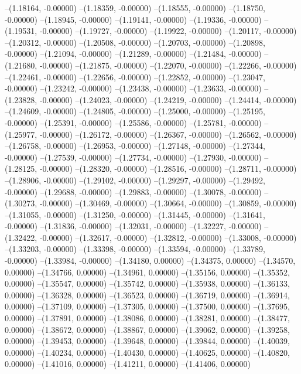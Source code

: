 --(1.18164, -0.00000)
--(1.18359, -0.00000)
--(1.18555, -0.00000)
--(1.18750, -0.00000)
--(1.18945, -0.00000)
--(1.19141, -0.00000)
--(1.19336, -0.00000)
--(1.19531, -0.00000)
--(1.19727, -0.00000)
--(1.19922, -0.00000)
--(1.20117, -0.00000)
--(1.20312, -0.00000)
--(1.20508, -0.00000)
--(1.20703, -0.00000)
--(1.20898, -0.00000)
--(1.21094, -0.00000)
--(1.21289, -0.00000)
--(1.21484, -0.00000)
--(1.21680, -0.00000)
--(1.21875, -0.00000)
--(1.22070, -0.00000)
--(1.22266, -0.00000)
--(1.22461, -0.00000)
--(1.22656, -0.00000)
--(1.22852, -0.00000)
--(1.23047, -0.00000)
--(1.23242, -0.00000)
--(1.23438, -0.00000)
--(1.23633, -0.00000)
--(1.23828, -0.00000)
--(1.24023, -0.00000)
--(1.24219, -0.00000)
--(1.24414, -0.00000)
--(1.24609, -0.00000)
--(1.24805, -0.00000)
--(1.25000, -0.00000)
--(1.25195, -0.00000)
--(1.25391, -0.00000)
--(1.25586, -0.00000)
--(1.25781, -0.00000)
--(1.25977, -0.00000)
--(1.26172, -0.00000)
--(1.26367, -0.00000)
--(1.26562, -0.00000)
--(1.26758, -0.00000)
--(1.26953, -0.00000)
--(1.27148, -0.00000)
--(1.27344, -0.00000)
--(1.27539, -0.00000)
--(1.27734, -0.00000)
--(1.27930, -0.00000)
--(1.28125, -0.00000)
--(1.28320, -0.00000)
--(1.28516, -0.00000)
--(1.28711, -0.00000)
--(1.28906, -0.00000)
--(1.29102, -0.00000)
--(1.29297, -0.00000)
--(1.29492, -0.00000)
--(1.29688, -0.00000)
--(1.29883, -0.00000)
--(1.30078, -0.00000)
--(1.30273, -0.00000)
--(1.30469, -0.00000)
--(1.30664, -0.00000)
--(1.30859, -0.00000)
--(1.31055, -0.00000)
--(1.31250, -0.00000)
--(1.31445, -0.00000)
--(1.31641, -0.00000)
--(1.31836, -0.00000)
--(1.32031, -0.00000)
--(1.32227, -0.00000)
--(1.32422, -0.00000)
--(1.32617, -0.00000)
--(1.32812, -0.00000)
--(1.33008, -0.00000)
--(1.33203, -0.00000)
--(1.33398, -0.00000)
--(1.33594, -0.00000)
--(1.33789, -0.00000)
--(1.33984, -0.00000)
--(1.34180, 0.00000)
--(1.34375, 0.00000)
--(1.34570, 0.00000)
--(1.34766, 0.00000)
--(1.34961, 0.00000)
--(1.35156, 0.00000)
--(1.35352, 0.00000)
--(1.35547, 0.00000)
--(1.35742, 0.00000)
--(1.35938, 0.00000)
--(1.36133, 0.00000)
--(1.36328, 0.00000)
--(1.36523, 0.00000)
--(1.36719, 0.00000)
--(1.36914, 0.00000)
--(1.37109, 0.00000)
--(1.37305, 0.00000)
--(1.37500, 0.00000)
--(1.37695, 0.00000)
--(1.37891, 0.00000)
--(1.38086, 0.00000)
--(1.38281, 0.00000)
--(1.38477, 0.00000)
--(1.38672, 0.00000)
--(1.38867, 0.00000)
--(1.39062, 0.00000)
--(1.39258, 0.00000)
--(1.39453, 0.00000)
--(1.39648, 0.00000)
--(1.39844, 0.00000)
--(1.40039, 0.00000)
--(1.40234, 0.00000)
--(1.40430, 0.00000)
--(1.40625, 0.00000)
--(1.40820, 0.00000)
--(1.41016, 0.00000)
--(1.41211, 0.00000)
--(1.41406, 0.00000)
